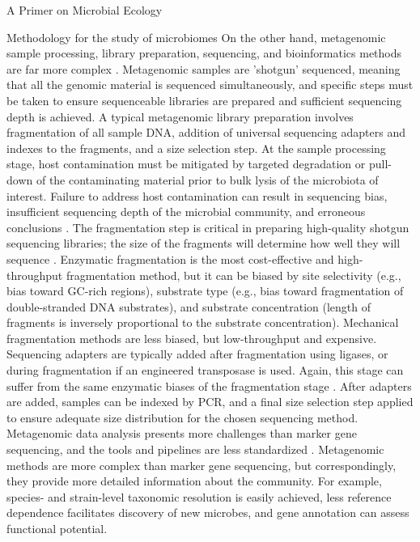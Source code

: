 \documentclass[oneside,12pt,final]{sty/ucthesis-CA2012}
\begin{document}
\begin{mainmatter}
\begin{section}{A Primer on Microbial Ecology}
\begin{subsection}{Methodology for the study of microbiomes}
On the other hand, metagenomic sample processing, library preparation, sequencing, and bioinformatics methods are far more complex \cite{RN101}. Metagenomic samples are 'shotgun' sequenced, meaning that all the genomic material is sequenced simultaneously, and specific steps must be taken to ensure sequenceable libraries are prepared and sufficient sequencing depth is achieved. A typical metagenomic library preparation involves fragmentation of all sample DNA, addition of universal sequencing adapters and indexes to the fragments, and a size selection step. At the sample processing stage, host contamination must be mitigated by targeted degradation or pull-down of the contaminating material prior to bulk lysis of the microbiota of interest. Failure to address host contamination can result in sequencing bias, insufficient sequencing depth of the microbial community, and erroneous conclusions \cite{RN100}. The fragmentation step is critical in preparing high-quality shotgun sequencing libraries; the size of the fragments will determine how well they will sequence \cite{RN102}. Enzymatic fragmentation is the most cost-effective and high-throughput fragmentation method, but it can be biased by site selectivity (e.g., bias toward GC-rich regions), substrate type (e.g., bias toward fragmentation of double-stranded DNA substrates), and substrate concentration (length of fragments is inversely proportional to the substrate concentration)\cite{RN103, RN104}. Mechanical fragmentation methods are less biased, but low-throughput and expensive. Sequencing adapters are typically added after fragmentation using ligases, or during fragmentation if an engineered transposase is used. Again, this stage can suffer from the same enzymatic biases of the fragmentation stage \cite{RN105}. After adapters are added, samples can be indexed by PCR, and a final size selection step applied to ensure adequate size distribution for the chosen sequencing method. Metagenomic data analysis presents more challenges than marker gene sequencing, and the tools and pipelines are less standardized \cite{RN101}. Metagenomic methods are more complex than marker gene sequencing, but correspondingly, they provide more detailed information about the community. For example, species- and strain-level taxonomic resolution is easily achieved, less reference dependence facilitates discovery of new microbes, and gene annotation can assess functional potential. 
\end{subsection}
\end{section}


\end{mainmatter}
\end{document}
